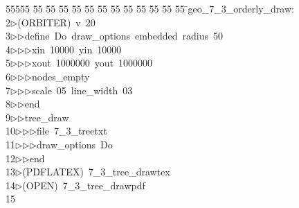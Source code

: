 %
%
\begin{tabbing}
55555 \= 55 \= 55 \= 55 \= 55 \= 55 \= 55 \= 55 \= 55 \= 55 \= 55 \= 55 \= 55 \= \>geo\_7\_3\_orderly\_draw:\\[0pt]
2\>$\triangleright$\>(ORBITER)\ v\ 20\ \\[0pt]
3\>$\triangleright$\>$\triangleright$\>define\ Do\ draw\_options\ embedded\ radius\ 50\ \\[0pt]
4\>$\triangleright$\>$\triangleright$\>$\triangleright$\>xin\ 10000\ yin\ 10000\ \\[0pt]
5\>$\triangleright$\>$\triangleright$\>$\triangleright$\>xout\ 1000000\ yout\ 1000000\ \\[0pt]
6\>$\triangleright$\>$\triangleright$\>$\triangleright$\>nodes\_empty\ \\[0pt]
7\>$\triangleright$\>$\triangleright$\>$\triangleright$\>scale\ 05\ line\_width\ 03\ \\[0pt]
8\>$\triangleright$\>$\triangleright$\>end\ \\[0pt]
9\>$\triangleright$\>$\triangleright$\>tree\_draw\ \\[0pt]
10\>$\triangleright$\>$\triangleright$\>$\triangleright$\>file\ 7\_3\_treetxt\ \\[0pt]
11\>$\triangleright$\>$\triangleright$\>$\triangleright$\>draw\_options\ Do\ \\[0pt]
12\>$\triangleright$\>$\triangleright$\>end\\[0pt]
13\>$\triangleright$\>(PDFLATEX)\ 7\_3\_tree\_drawtex\\[0pt]
14\>$\triangleright$\>(OPEN)\ 7\_3\_tree\_drawpdf\\[0pt]
15\>\end{tabbing}
